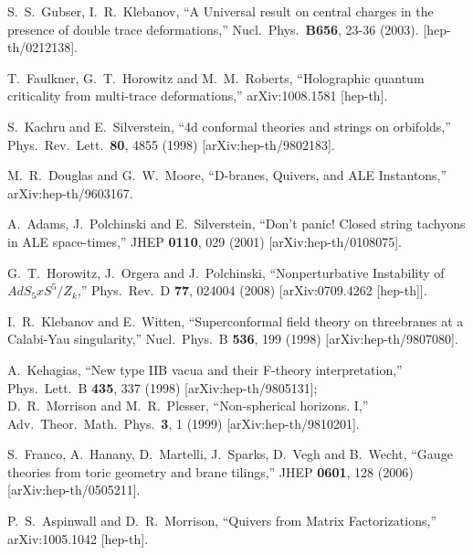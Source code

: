 \documentclass[12pt]{article}
\begin{document}
{\begin{thebibliography}{99}
 S.~S.~Gubser, I.~R.~Klebanov,
  ``A Universal result on central charges in the presence of double trace deformations,''
  Nucl.\ Phys.\  {\bf B656}, 23-36 (2003).
  [hep-th/0212138].
  
  T.~Faulkner, G.~T.~Horowitz and M.~M.~Roberts,
  ``Holographic quantum criticality from multi-trace deformations,''
  arXiv:1008.1581 [hep-th].

  
  S.~Kachru and E.~Silverstein,
  ``4d conformal theories and strings on orbifolds,''
  Phys.\ Rev.\ Lett.\  {\bf 80}, 4855 (1998)
  [arXiv:hep-th/9802183].

  
  M.~R.~Douglas and G.~W.~Moore,
  ``D-branes, Quivers, and ALE Instantons,''
  arXiv:hep-th/9603167.

  A.~Adams, J.~Polchinski and E.~Silverstein,
  ``Don't panic! Closed string tachyons in ALE space-times,''
  JHEP {\bf 0110}, 029 (2001)
  [arXiv:hep-th/0108075].

  G.~T.~Horowitz, J.~Orgera and J.~Polchinski,
  ``Nonperturbative Instability of $AdS_5 x S^5/Z_k$,''
  Phys.\ Rev.\  D {\bf 77}, 024004 (2008)
  [arXiv:0709.4262 [hep-th]].
  
  I.~R.~Klebanov and E.~Witten,
  ``Superconformal field theory on threebranes at a Calabi-Yau  singularity,''
  Nucl.\ Phys.\  B {\bf 536}, 199 (1998)
  [arXiv:hep-th/9807080].
   
  A.~Kehagias,
  ``New type IIB vacua and their F-theory interpretation,''
  Phys.\ Lett.\  B {\bf 435}, 337 (1998)
  [arXiv:hep-th/9805131];\\
 D.~R.~Morrison and M.~R.~Plesser,
  ``Non-spherical horizons. I,''
  Adv.\ Theor.\ Math.\ Phys.\  {\bf 3}, 1 (1999)
  [arXiv:hep-th/9810201].
  
  S.~Franco, A.~Hanany, D.~Martelli, J.~Sparks, D.~Vegh and B.~Wecht,
  ``Gauge theories from toric geometry and brane tilings,''
  JHEP {\bf 0601}, 128 (2006)
  [arXiv:hep-th/0505211].
   
  P.~S.~Aspinwall and D.~R.~Morrison,
  ``Quivers from Matrix Factorizations,''
  arXiv:1005.1042 [hep-th].


\end{thebibliography}}
\end{document}
